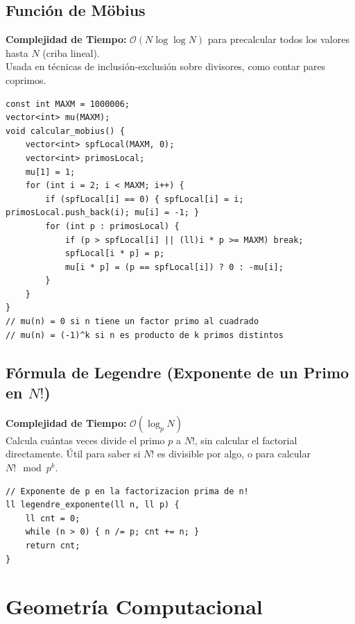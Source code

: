 \documentclass[10pt,twocolumn,letterpaper]{report}
\begin{document}
\section{Función de Möbius}
\textbf{Complejidad de Tiempo:} $\mathcal{O}(N \log \log N)$ para precalcular todos los valores hasta $N$ (criba lineal). \\
Usada en técnicas de inclusión-exclusión sobre divisores, como contar pares coprimos.
\begin{lstlisting}
const int MAXM = 1000006;
vector<int> mu(MAXM);
void calcular_mobius() {
    vector<int> spfLocal(MAXM, 0);
    vector<int> primosLocal;
    mu[1] = 1;
    for (int i = 2; i < MAXM; i++) {
        if (spfLocal[i] == 0) { spfLocal[i] = i; primosLocal.push_back(i); mu[i] = -1; }
        for (int p : primosLocal) {
            if (p > spfLocal[i] || (ll)i * p >= MAXM) break;
            spfLocal[i * p] = p;
            mu[i * p] = (p == spfLocal[i]) ? 0 : -mu[i];
        }
    }
}
// mu(n) = 0 si n tiene un factor primo al cuadrado
// mu(n) = (-1)^k si n es producto de k primos distintos
\end{lstlisting}
\section{Fórmula de Legendre (Exponente de un Primo en $N!$)}
\textbf{Complejidad de Tiempo:} $\mathcal{O}(\log_p N)$ \\
Calcula cuántas veces divide el primo $p$ a $N!$, sin calcular el factorial directamente. Útil para saber si $N!$ es divisible por algo, o para calcular $N! \mod p^k$.
\begin{lstlisting}
// Exponente de p en la factorizacion prima de n!
ll legendre_exponente(ll n, ll p) {
    ll cnt = 0;
    while (n > 0) { n /= p; cnt += n; }
    return cnt;
}
\end{lstlisting}
\chapter{Geometría Computacional}
\end{document}
